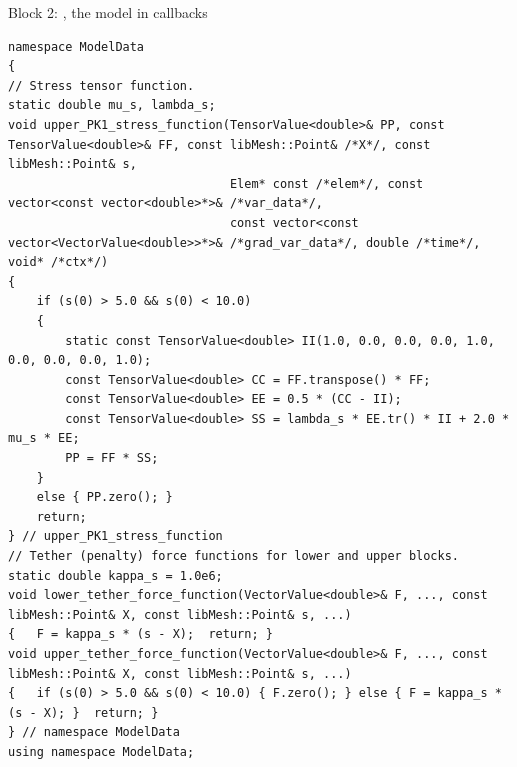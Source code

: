 \documentclass[aspectratio=169,11pt]{beamer}
\begin{document}
\begin{frame}[fragile]{Block 2: , the model in callbacks}
\label{fr:model}
\begin{lstlisting}[style=cpptiny]
namespace ModelData
{
// Stress tensor function.
static double mu_s, lambda_s;
void upper_PK1_stress_function(TensorValue<double>& PP, const TensorValue<double>& FF, const libMesh::Point& /*X*/, const libMesh::Point& s,
                               Elem* const /*elem*/, const vector<const vector<double>*>& /*var_data*/,
                               const vector<const vector<VectorValue<double>>*>& /*grad_var_data*/, double /*time*/, void* /*ctx*/)
{
    if (s(0) > 5.0 && s(0) < 10.0)
    {
        static const TensorValue<double> II(1.0, 0.0, 0.0, 0.0, 1.0, 0.0, 0.0, 0.0, 1.0);
        const TensorValue<double> CC = FF.transpose() * FF;
        const TensorValue<double> EE = 0.5 * (CC - II);
        const TensorValue<double> SS = lambda_s * EE.tr() * II + 2.0 * mu_s * EE;
        PP = FF * SS;
    }
    else { PP.zero(); }
    return;
} // upper_PK1_stress_function
// Tether (penalty) force functions for lower and upper blocks.
static double kappa_s = 1.0e6;
void lower_tether_force_function(VectorValue<double>& F, ..., const libMesh::Point& X, const libMesh::Point& s, ...)
{   F = kappa_s * (s - X);  return; }
void upper_tether_force_function(VectorValue<double>& F, ..., const libMesh::Point& X, const libMesh::Point& s, ...)
{   if (s(0) > 5.0 && s(0) < 10.0) { F.zero(); } else { F = kappa_s * (s - X); }  return; }
} // namespace ModelData
using namespace ModelData;
\end{lstlisting}
\end{frame}
\end{document}
